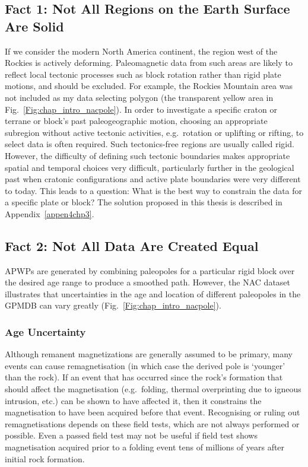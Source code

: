 \subsection{Fact 1: Not All Regions on the Earth Surface Are
Solid}\label{sec:f1}

If we consider the modern North America continent, the region west of the
Rockies is actively deforming. Paleomagnetic data from such areas are likely to
reflect local tectonic processes such as block rotation rather than rigid plate
motions, and should be excluded. For example, the Rockies Mountain area was not
included as my data selecting polygon (the transparent yellow area in
Fig.~\ref{Fig:chap_intro_nacpole}). In order to investigate a specific craton or
terrane or block's past paleogeographic motion, choosing an appropriate
subregion without active tectonic activities, e.g.\ rotation or uplifting or
rifting, to select data is often required. Such tectonics-free regions are
usually called rigid. However, the difficulty of defining such tectonic
boundaries makes appropriate spatial and temporal choices very difficult,
particularly further in the geological past when cratonic configurations and
active plate boundaries were very different to today. This leads to a question:
What is the best way to constrain the data for a specific plate or block? The
solution proposed in this thesis is described in Appendix~\ref{appen4chp3}.

\subsection{Fact 2: Not All Data Are Created Equal}\label{sec:f2}

APWPs are generated by combining paleopoles for a particular rigid block over
the desired age range to produce a smoothed path. However, the NAC dataset
illustrates that uncertainties in the age and location of different paleopoles
in the GPMDB can vary greatly (Fig.~\ref{Fig:chap_intro_nacpole}).

\subsubsection{Age Uncertainty}\label{sec:ageu}

Although remanent magnetizations are generally assumed to be primary, many
events can cause remagnetisation (in which case the derived pole is `younger'
than the rock). If an event that has occurred since the rock's formation that
should affect the magnetisation (e.g.\ folding, thermal overprinting due to
igneous intrusion, etc.) can be shown to have affected it, then it constrains
the magnetisation to have been acquired before that event. Recognising or ruling
out remagnetisations depends on these field tests, which are not always
performed or possible. Even a passed field test may not be useful if field test
shows magnetisation acquired prior to a folding event tens of millions of years
after initial rock formation.

